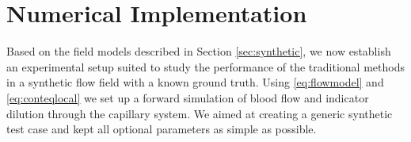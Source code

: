 \documentclass[journal,twocolumn]{IEEEtran}
\newcommand{\ca}{c_\mathrm{a}}
\begin{document}
	
	
	
	\section{Numerical Implementation}\label{sec:NumExp}
	Based on the field models described in Section \ref{sec:synthetic}, we now establish an experimental setup suited to study the performance of the traditional methods in a synthetic flow field with a known ground truth. Using \eqref{eq:flowmodel} and \eqref{eq:conteqlocal} we set up a forward simulation of blood flow and indicator dilution through the capillary system. We aimed at creating a generic synthetic test case and kept all optional parameters as simple as possible. 
	
\end{document}
